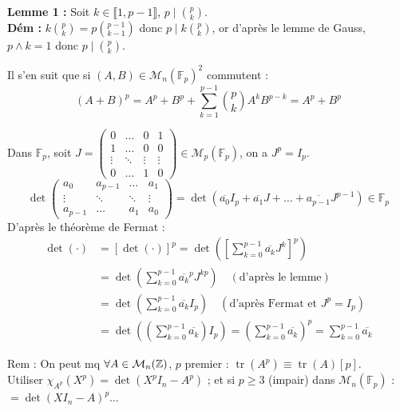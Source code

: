 \begin{solution}
\textbf{Lemme 1 :} Soit $k \in \llbracket 1, p-1 \rrbracket$, $p \mid \binom{p}{k}$. \\
\textbf{Dém :} $k \binom{p}{k} = p \binom{p-1}{k-1}$ donc $p \mid k \binom{p}{k}$, or d'après le lemme de Gauss, $p \wedge k = 1$ donc $p \mid \binom{p}{k}$.

Il s'en suit que si $(A,B) \in \mathcal{M}_n(\mathbb{F}_p)^2$ commutent :
\[ (A+B)^p = A^p + B^p + \sum_{k=1}^{p-1} \binom{p}{k} A^k B^{p-k} = A^p + B^p \]

Dans $\mathbb{F}_p$, soit $J = \begin{pmatrix} 0 & \dots & 0 & 1 \\ 1 & \dots & 0 & 0 \\ \vdots & \ddots & \vdots & \vdots \\ 0 & \dots & 1 & 0 \end{pmatrix} \in \mathcal{M}_p(\mathbb{F}_p)$, on a $J^p = I_p$.
\[ \det\begin{pmatrix} a_0 & a_{p-1} & \dots & a_1 \\ \vdots & \ddots & \ddots & \vdots \\ a_{p-1} & \dots & a_1 & a_0 \end{pmatrix} = \det\left(\overline{a_0} I_p + \overline{a_1} J + \dots + \overline{a_{p-1}} J^{p-1}\right) \in \mathbb{F}_p \]
D'après le théorème de Fermat :
\begin{align*}
\det(\cdot) &= [\det(\cdot)]^p = \det\left( \left[ \sum_{k=0}^{p-1} \overline{a_k} J^k \right]^p \right) \\
&= \det\left( \sum_{k=0}^{p-1} \overline{a_k}^p J^{kp} \right) \quad (\text{d'après le lemme}) \\
&= \det\left( \sum_{k=0}^{p-1} \overline{a_k} I_p \right) \quad (\text{d'après Fermat et } J^p = I_p) \\
&= \det\left( \left(\sum_{k=0}^{p-1} \overline{a_k}\right) I_p \right) = \left( \sum_{k=0}^{p-1} \overline{a_k} \right)^p = \sum_{k=0}^{p-1} \overline{a_k}
\end{align*}

\begin{remarkbox}
Rem : On peut mq $\forall A \in \mathcal{M}_n(\mathbb Z)$, $p$ premier :
$\operatorname{tr}(A^p) \equiv \operatorname{tr}(A) [p]$. \\
Utiliser $\chi_{A^p}(X^p) = \det(X^p I_n - A^p)$ ; et si $p \geq 3$ (impair) dans $\mathcal{M}_n(\mathbb{F}_p)$ :
$= \det(X I_n - A)^p \dots$
\end{remarkbox}
\end{solution}

